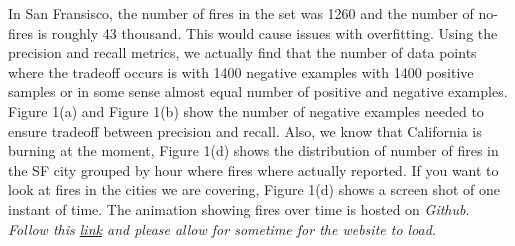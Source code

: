 \documentclass[10pt]{article}
\begin{document}
In San Fransisco, the number of fires in the set was 1260 and the number of
no-fires is roughly 43 thousand. This would cause issues with overfitting.
Using the precision and recall metrics, we actually find that the number of
data points where the tradeoff occurs is with 1400 negative examples with 1400
positive samples or in some sense almost equal number of positive and negative
examples. Figure 1(a) and Figure 1(b) show the number of negative examples
needed to ensure tradeoff between precision and recall. Also, we know that
California is burning at the moment, Figure 1(d) shows the distribution of
number of fires in the SF city grouped by hour where fires where actually
reported. If you want to look at fires in the cities we are covering,
Figure 1(d) shows a screen shot of one instant of time. The animation showing
fires over time is hosted on \textit{Github}.
\textit{Follow this
\href{https://leafyao8621.github.io/firevisualization.github.io/}{link}
and please allow for sometime for the website to load}.\par
\end{document}

